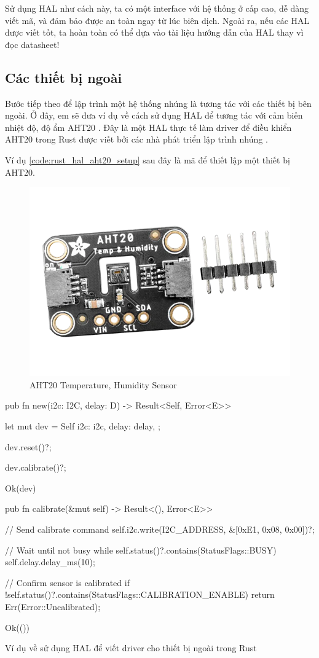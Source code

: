 Sử dụng HAL như cách này, ta có một interface với hệ thống ở cấp cao, dễ dàng viết mã, và đảm bảo được an toàn ngay từ lúc biên dịch.
Ngoài ra, nếu các HAL được viết tốt, ta hoàn toàn có thể dựa vào tài liệu hướng dẫn của HAL thay vì đọc datasheet!

\subsection{Các thiết bị ngoài}
Bước tiếp theo để lập trình một hệ thống nhúng là tương tác với các thiết bị bên ngoài.
Ở đây, em sẽ đưa ví dụ về cách sử dụng HAL để tương tác với cảm biến nhiệt độ, độ ẩm AHT20 \cite{aht20_datasheet}.
Đây là một HAL thực tế làm driver để điều khiển AHT20 trong Rust được viết bởi các nhà phát triển lập trình nhúng \cite{hal_aht20}.

Ví dụ \ref{code:rust_hal_aht20_setup} sau đây là mã để thiết lập một thiết bị AHT20.

\begin{figure}[ht]
\centering
\includegraphics[scale=0.5]{images/aht20.png}
\caption{AHT20 Temperature, Humidity Sensor}
\end{figure}

\clearpage
\begin{listing}[ht]
\begin{rustcode}
pub fn new(i2c: I2C, delay: D) -> Result<Self, Error<E>> {
    let mut dev = Self {
        i2c: i2c,
        delay: delay,
    };

    dev.reset()?;

    dev.calibrate()?;

    Ok(dev)
}
pub fn calibrate(&mut self) -> Result<(), Error<E>> {
    // Send calibrate command
    self.i2c.write(I2C_ADDRESS, &[0xE1, 0x08, 0x00])?;

    // Wait until not busy
    while self.status()?.contains(StatusFlags::BUSY) {
        self.delay.delay_ms(10);
    }

    // Confirm sensor is calibrated
    if !self.status()?.contains(StatusFlags::CALIBRATION_ENABLE) {
        return Err(Error::Uncalibrated);
    }

    Ok(())
}
\end{rustcode}
\caption{Ví dụ về sử dụng HAL để viết driver cho thiết bị ngoài trong Rust}
\label{code:rust_hal_aht20_setup}
\end{listing}

